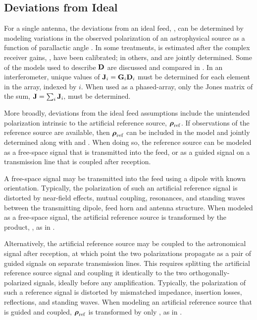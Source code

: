 
\subsection{ Deviations from Ideal }
\label{sec:calibration_deviation}

For a single antenna, the deviations from an ideal feed, , can be 
determined by modeling variations in the observed polarization of an astrophysical source as a function of parallactic angle \cite[e.g.,][]{scr+84,xil91,mck92,hpn+01,joh02,van04c}.
%
In some treatments,  is estimated after the complex receiver gains, , have been calibrated; in others,  and  are jointly determined.
%
Some of the models used to describe ${\bf D}$ are discussed and compared in .
%
In an interferometer, unique values of ${\bf J}_i = {\bf G}_i {\bf D}_i$ must be determined
for each element in the array, indexed by $i$.  When used as a phased-array, only the Jones matrix of the sum, ${\bf J} = \sum_i {\bf J}_i,$
must be determined.

More broadly, deviations from the ideal feed assumptions include the 
unintended polarization intrinsic to the artificial reference source, $\mbox{\boldmath $\rho$}_\mathrm{ref}$.
%
If observations of the reference source are available, then $\mbox{\boldmath $\rho$}_\mathrm{ref}$ can be included in the model and jointly determined along with  and .
%
When doing so, the reference source can be modeled
as a free-space signal that is transmitted into the feed, or
as a guided signal on a transmission line that is coupled after reception.

A free-space signal may be transmitted into the feed using a dipole with known orientation.
%
Typically, the polarization of such an artificial reference signal is distorted by near-field effects, mutual coupling, resonances, and standing waves between the transmitting dipole, feed horn and antenna structure. 
%
%
When modeled as a free-space signal, the artificial reference source
is transformed by the product, , as in \cite{van04c}.

Alternatively, the artificial reference source may be coupled to the astronomical signal after reception, at which point the two polarizations propagate as a pair of guided signals on separate transmission lines.
%
This requires splitting the artificial reference source signal and coupling it identically to the two orthogonally-polarized signals, ideally before any amplification.
%
Typically, the polarization of such a reference signal is distorted by mismatched impedance, insertion losses, reflections, and standing waves.
%
When modeling an artificial reference source that is guided and coupled,
$\mbox{\boldmath $\rho$}_\mathrm{ref}$ is transformed by only
, as in \cite{bja+20}.

